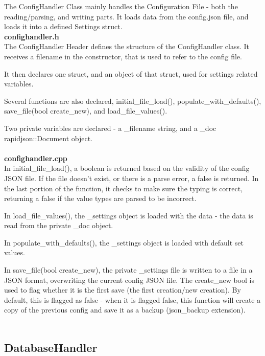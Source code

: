 \documentclass[conference]{IEEEtran}
\begin{document}
The ConfigHandler Class mainly handles the Configuration File - both the reading/parsing, and writing parts. It loads data from the config.json file, and loads it into a defined Settings struct.\\


\textbf{confighandler.h}~\\

The ConfigHandler Header defines the structure of the ConfigHandler class. It receives a filename in the constructor, that is used to refer to the config file.

It then declares one struct, and an object of that struct, used for settings related variables.

Several functions are also declared, initial\_file\_load(), populate\_with\_defaults(), save\_file(bool create\_new), and load\_file\_values().

Two private variables are declared - a \_filename string, and a \_doc rapidjson::Document object.~\\~\\


\textbf{confighandler.cpp}~\\

In initial\_file\_load(), a boolean is returned based on the validity of the config JSON file. If the file doesn't exist, or there is a parse error, a false is returned. In the last portion of the function, it checks to make sure the typing is correct, returning a false if the value types are parsed to be incorrect.

In load\_file\_values(), the \_settings object is loaded with the data - the data is read from the private \_doc object.

In populate\_with\_defaults(), the \_settings object is loaded with default set values.

In save\_file(bool create\_new), the private \_settings file is written to a file in a JSON format, overwriting the current config JSON file. The create\_new bool is used to flag whether it is the first save (the first creation/new creation). By default, this is flagged as false - when it is flagged false, this function will create a copy of the previous config and save it as a backup (json\_backup extension).~\\~\\


\subsection{DatabaseHandler}
\end{document}
